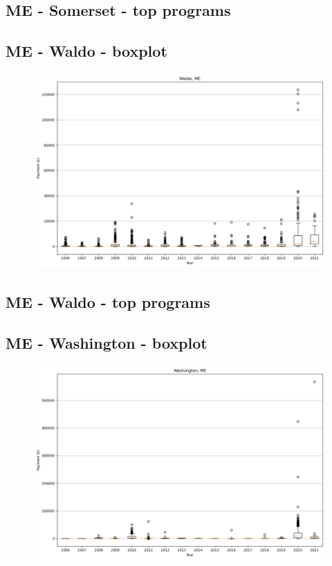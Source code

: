 \subsection*{ME - Somerset - top programs}

\newpage
\subsection*{ME - Waldo - boxplot}
\begin{figure}[h]
\centering
\includegraphics[width=7in]{../output/boxplots/counties/Waldo-ME_boxplot.png}
\end{figure}


\subsection*{ME - Waldo - top programs}

\newpage
\subsection*{ME - Washington - boxplot}
\begin{figure}[h]
\centering
\includegraphics[width=7in]{../output/boxplots/counties/Washington-ME_boxplot.png}
\end{figure}


